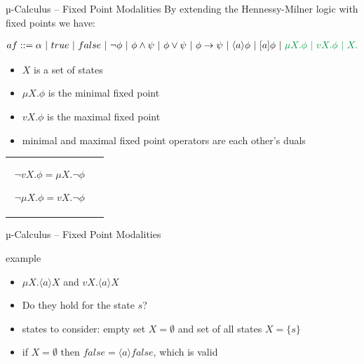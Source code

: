 \documentclass[aspectratio=1610]{beamer}
\begin{document}
  \begin{frame}{µ-Calculus – Fixed Point Modalities}
    By extending the Hennessy-Milner logic with fixed points we have:
    \resizebox{ \textwidth}{!} {
      \begin{minipage}{\textwidth}
        \begin{align*}
          af ::= \alpha\ |\ true\ |\ false\ |\ \neg \phi\ |\ \phi \land \psi\ |\ \phi \lor \psi\ |\ \phi \to \psi\ |\ \langle a \rangle \phi \ |\ [a]\phi\ |\ \color{green} \mu X. \phi \ |\ vX. \phi \ |\ X.
        \end{align*}
      \end{minipage}
    }
    \begin{itemize}
      \item $X$ is a set of states
      \item $\mu X. \phi$ is the minimal fixed point
      \item $vX. \phi$ is the maximal fixed point
      \item minimal and maximal fixed point operators are each other's duals
    \end{itemize}
    \begin{tabular}{cc}
      \begin{minipage}{.47\linewidth}
        \begin{align*}
          \neg vX. \phi = \mu X. \neg \phi
        \end{align*}
      \end{minipage}
      \begin{minipage}{.47\linewidth}
        \begin{align*}
          \neg \mu X. \phi = vX. \neg \phi
        \end{align*}
      \end{minipage}
    \end{tabular}
  \end{frame}

  \begin{frame}{µ-Calculus – Fixed Point Modalities}
    \begin{exampleblock}{example}
      \begin{itemize}
        \item $\mu X. \langle a \rangle X$ and $vX. \langle a \rangle X$
        \item Do they hold for the state $s$?
        \item states to consider: empty set $X = \emptyset$ and set of all states $X = \{s\}$
        \item if $X = \emptyset$ then $false = \langle a \rangle false$, which is valid
      \end{itemize}
    \end{exampleblock}
  \end{frame}
\end{document}
